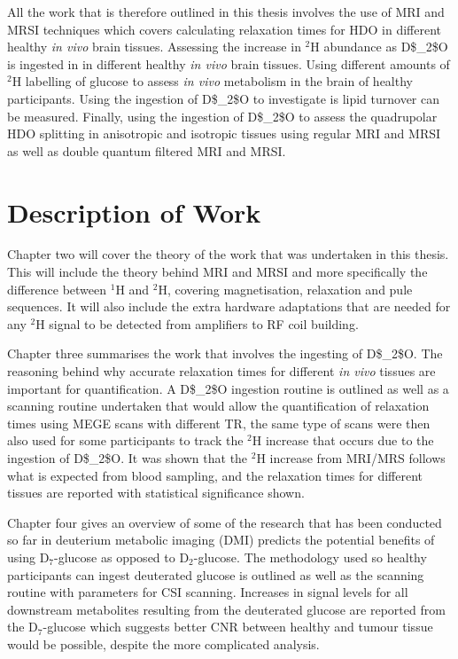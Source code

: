 All the work that is therefore outlined in this thesis involves the use of \ac{MRI} and \ac{MRSI} techniques which covers calculating relaxation times for \ac{HDO} in different healthy \textit{in vivo} brain tissues. Assessing the increase in $^2$H abundance as \Ac{D$_2$O} is ingested in in different healthy \textit{in vivo} brain tissues. Using different amounts of $^2$H labelling of glucose to assess \textit{in vivo} metabolism in the brain of healthy participants. Using the ingestion of \Ac{D$_2$O} to investigate is lipid turnover can be measured. Finally, using the ingestion of \Ac{D$_2$O} to assess the quadrupolar HDO splitting in anisotropic and isotropic tissues using regular \ac{MRI} and \ac{MRSI} as well as double quantum filtered \ac{MRI} and MRSI.

\section{Description of Work}

Chapter two will cover the theory of the work that was undertaken in this thesis. This will include the theory behind \ac{MRI} and \ac{MRSI} and more specifically the difference between $^1$H and $^2$H, covering magnetisation, relaxation and pule sequences. It will also include the extra hardware adaptations that are needed for any $^2$H signal to be detected from amplifiers to RF coil building.

Chapter three summarises the work that involves the ingesting of \ac{D$_2$O}. The reasoning behind why accurate relaxation times for different \textit{in vivo} tissues are important for quantification. A \ac{D$_2$O} ingestion routine is outlined as well as a scanning routine undertaken that would allow the quantification of relaxation times using \ac{MEGE} scans with different \ac{TR}, the same type of scans were then also used for some participants to track the $^2$H increase that occurs due to the ingestion of \ac{D$_2$O}. It was shown that the $^2$H increase from \ac{MRI}/\ac{MRS} follows what is expected from blood sampling, and the relaxation times for different tissues are reported with statistical significance shown.

Chapter four gives an overview of some of the research that has been conducted so far in deuterium metabolic imaging (DMI) predicts the potential benefits of using D$_7$-glucose as opposed to D$_2$-glucose. The methodology used so healthy participants can ingest deuterated glucose is outlined as well as the scanning routine with parameters for CSI scanning. Increases in signal levels for all downstream metabolites resulting from the deuterated glucose are reported from the D$_7$-glucose which suggests better \ac{CNR} between healthy and tumour tissue would be possible, despite the more complicated analysis.

